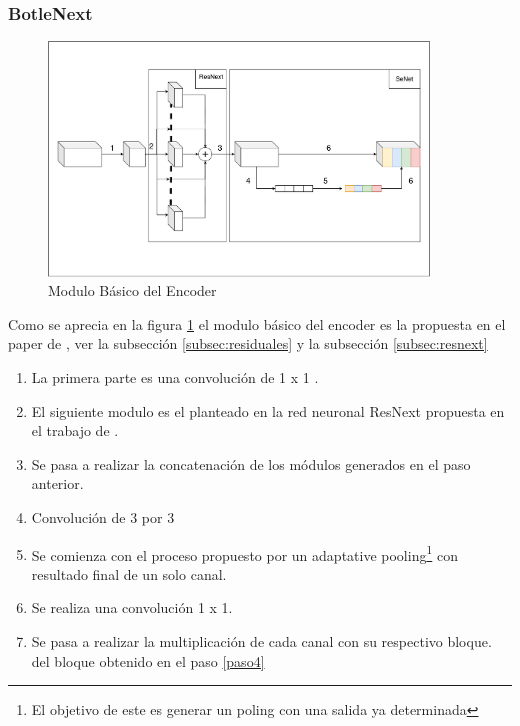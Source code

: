 \subsubsection{BotleNext}
\begin{figure}[H]
    \centering
    \includegraphics[width=0.9\textwidth]{images/blocks/botlenext.pdf}
    \caption{Modulo Básico del Encoder}
    \label{fig:moduloEncoder}
\end{figure}
Como se aprecia en la figura \ref{fig:moduloEncoder} el modulo básico del encoder es la propuesta en el paper de \cite{Hu2017}, ver la subsección \ref{subsec:residuales} y la subsección \ref{subsec:resnext} 
\begin{enumerate}
    \item  La primera parte es una convolución de 1 x 1 .
    \item  El siguiente modulo es el planteado en la red neuronal ResNext propuesta en el trabajo de \cite{Xie2017}.
    \item  Se pasa a realizar la concatenación de los módulos generados en el paso anterior.
    \item Convolución  de 3 por 3 \label{paso4}
    \item Se comienza con el proceso propuesto por \cite{Hu2017} un adaptative pooling\footnote{El objetivo de este es generar un poling con una salida ya determinada} con resultado final de un solo canal.
    \item Se realiza una convolución 1 x 1.
    \item Se pasa a realizar la multiplicación de cada canal con su respectivo bloque. del bloque obtenido en el paso \ref{paso4} 
\end{enumerate}
